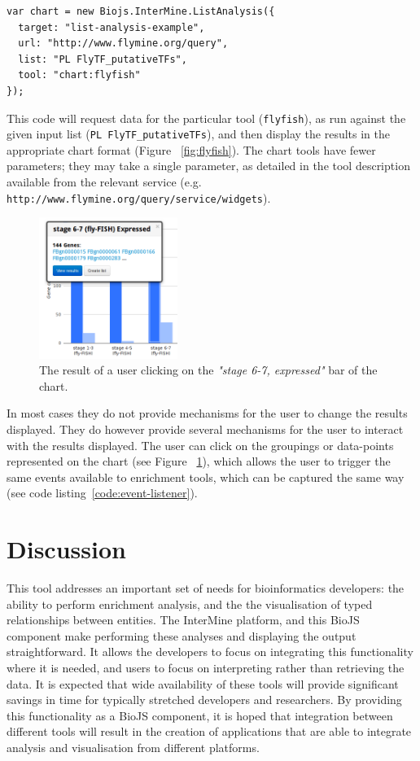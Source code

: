 \documentclass[10pt,a4paper,twocolumn]{article}
\begin{document}
\begin{lstlisting}[caption={Loading a chart list analysis tool.},label={code:load-chart}]
var chart = new Biojs.InterMine.ListAnalysis({
  target: "list-analysis-example",
  url: "http://www.flymine.org/query",
  list: "PL FlyTF_putativeTFs",
  tool: "chart:flyfish"
});
\end{lstlisting}

This code will request data for the particular tool (\texttt{flyfish}), as run
against the given input list (\texttt{PL FlyTF\_putativeTFs}), and then display
the results in the appropriate chart format (Figure ~\ref{fig:flyfish}). The
chart tools have fewer parameters; they may take a single parameter, as detailed
in the tool description available from the relevant service (e.g.
\texttt{http://www.flymine.org/query/service/widgets}).

\begin{figure}
\centering
\includegraphics[width=0.4\textwidth]{im-widgets-flyfish-selected.png}
\caption{\label{fig:click-chart}The result of a user clicking on the
\emph{"stage 6-7, expressed"} bar of the chart.}
\end{figure}

In most cases they do not provide mechanisms for the user to change the results
displayed. They do however provide several mechanisms for the user to interact
with the results displayed. The user can click on the groupings or data-points
represented on the chart (see Figure ~\ref{fig:click-chart}), which allows the
user to trigger the same events available to enrichment tools, which can be
captured the same way (see code listing~\ref{code:event-listener}).

\section*{Discussion}

This tool addresses an important set of needs for bioinformatics developers: the
ability to perform enrichment analysis, and the the visualisation of typed
relationships between entities.  The InterMine platform, and this BioJS
component make performing these analyses and displaying the output
straightforward. It allows the developers to focus on integrating this
functionality where it is needed, and users to focus on interpreting rather than
retrieving the data. It is expected that wide availability of these tools will
provide significant savings in time for typically stretched developers and
researchers.  By providing this functionality as a BioJS component, it is hoped
that integration between different tools will result in the creation of
applications that are able to integrate analysis and visualisation from
different platforms.
\end{document}
